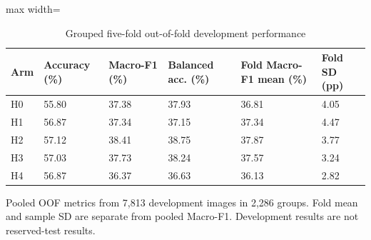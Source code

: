 \begin{table}[t]
\centering
\small
\caption{Grouped five-fold out-of-fold development performance}
\label{tab:04-development-oof}
\begin{adjustbox}{max width=\textwidth}
\begin{tabular}{llllll}
\toprule
\textbf{Arm} & \textbf{Accuracy (\%)} & \textbf{Macro-F1 (\%)} & \textbf{Balanced acc. (\%)} & \textbf{Fold Macro-F1 mean (\%)} & \textbf{Fold SD (pp)} \\
\midrule
H0 & 55.80 & 37.38 & 37.93 & 36.81 & 4.05 \\
H1 & 56.87 & 37.34 & 37.15 & 37.34 & 4.47 \\
H2 & 57.12 & 38.41 & 38.75 & 37.87 & 3.77 \\
H3 & 57.03 & 37.73 & 38.24 & 37.57 & 3.24 \\
H4 & 56.87 & 36.37 & 36.63 & 36.13 & 2.82 \\
\bottomrule
\end{tabular}
\end{adjustbox}
\par\smallskip
\begin{minipage}{\textwidth}\footnotesize Pooled OOF metrics from 7,813 development images in 2,286 groups. Fold mean and sample SD are separate from pooled Macro-F1. Development results are not reserved-test results.\end{minipage}
\end{table}
